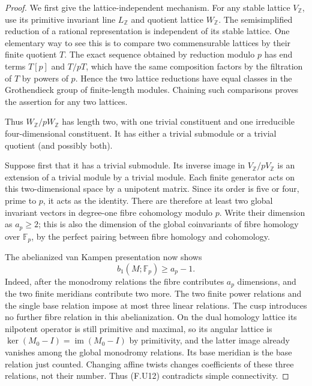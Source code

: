 \begin{proof}
We first give the lattice-independent mechanism.  For any
stable lattice $V_\mathbb Z$, use its primitive invariant
line $L_\mathbb Z$ and quotient lattice $W_\mathbb Z$.
The semisimplified reduction of a rational representation is
independent of its stable lattice.  One elementary way to see
this is to compare two commensurable lattices by their finite
quotient $T$.  The exact sequence obtained by reduction modulo
$p$ has end terms $T[p]$ and $T/pT$, which have the same
composition factors by the filtration of $T$ by powers of $p$.
Hence the two lattice reductions have equal classes in the
Grothendieck group of finite-length modules.  Chaining such
comparisons proves the assertion for any two lattices.

Thus $W_\mathbb Z/pW_\mathbb Z$ has length two, with one
trivial constituent and one irreducible four-dimensional
constituent.  It has either a trivial submodule or a trivial
quotient (and possibly both).

Suppose first that it has a trivial submodule.  Its inverse
image in $V_\mathbb Z/pV_\mathbb Z$ is an extension of a
trivial module by a trivial module.  Each finite generator
acts on this two-dimensional space by a unipotent matrix.
Since its order is five or four, prime to $p$, it acts as
the identity.  There are therefore at least two global
invariant vectors in degree-one fibre cohomology modulo $p$.
Write their dimension as $a_p\ge2$; this is also the
dimension of the global coinvariants of fibre homology over
$\mathbb F_p$, by the perfect pairing between fibre homology
and cohomology.

The abelianized van Kampen presentation now shows
\[
 b_1(M;\mathbb F_p)\ge a_p-1.
 \tag{F.U12}
\]
Indeed, after the monodromy relations the fibre contributes
$a_p$ dimensions, and the two finite meridians contribute
two more.  The two finite power relations and the single
base relation impose at most three linear relations.
The cusp introduces no further fibre relation in this
abelianization.  On the dual homology lattice its nilpotent
operator is still primitive and maximal, so its angular lattice is
$\ker(M_0-I)=\operatorname{im}(M_0-I)$ by primitivity, and
the latter image already vanishes among the global
monodromy relations.  Its base meridian is the base relation
just counted.  Changing affine twists changes coefficients
of these three relations, not their number.  Thus (F.U12)
contradicts simple connectivity.


\end{proof}
